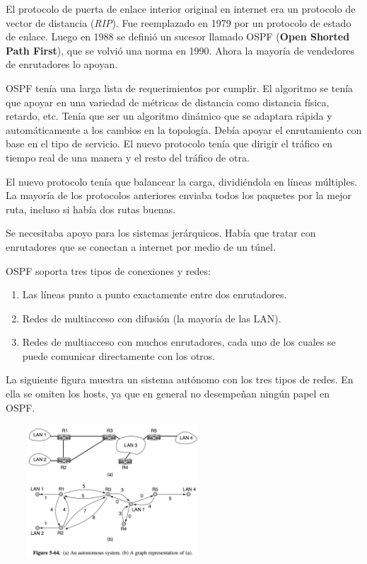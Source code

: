 	\par El protocolo de puerta de enlace interior original en internet era un protocolo de vector de distancia (\textit{RIP}). Fue reemplazado en 1979 por un protocolo de estado de enlace. Luego en 1988 se definió un sucesor llamado OSPF (\textbf{Open Shorted Path First}), que se volvió una norma en 1990. Ahora la mayoría de vendedores de enrutadores lo apoyan.
	
	\par OSPF tenía una larga lista de requerimientos por cumplir. El algoritmo se tenía que apoyar en una variedad de métricas de distancia como distancia física, retardo, etc. Tenía que ser un algoritmo dinámico que se adaptara rápida y automáticamente a los cambios en la topología. Debía apoyar el enrutamiento con base en el tipo de servicio. El nuevo protocolo tenía que dirigir el tráfico en tiempo real de una manera y el resto del tráfico de otra.
	
	\par El nuevo protocolo tenía que balancear la carga, dividiéndola en líneas múltiples. La mayoría de los protocolos anteriores enviaba todos los paquetes por la mejor ruta, incluso si había dos rutas buenas.

	\par Se necesitaba apoyo para los sistemas jerárquicos. Había que tratar con enrutadores que se conectan a internet por medio de un túnel.

	\par OSPF soporta tres tipos de conexiones y redes:

		\begin{enumerate}
			\item Las líneas punto a punto exactamente entre dos enrutadores.
			\item Redes de multiacceso con difusión (la mayoría de las LAN).
			\item Redes de multiacceso con muchos enrutadores, cada uno de los cuales se puede comunicar directamente con los otros.
		\end{enumerate}

	\par La siguiente figura muestra un sistema autónomo con los tres tipos de redes. En ella se omiten los hosts, ya que en general no desempeñan ningún papel en OSPF.

		\begin{center}
			\includegraphics[width=8cm, height=5cm]{./imagenes/ospf.png} 
		\end{center}

